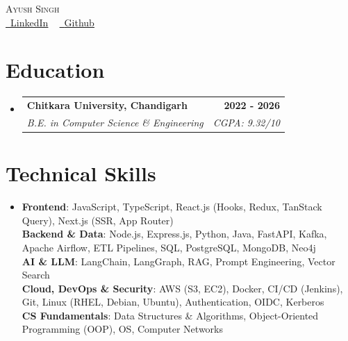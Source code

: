 \documentclass[letterpaper,11pt]{article}
\makeatletter
\newcommand{\resumeSubheading}[4]{
  \vspace{-2pt}\item
    \begin{tabular*}{1.0\textwidth}[t]{l@{\extracolsep{\fill}}r}
      \textbf{#1} & \textbf{\small #2} \\
      \textit{\small#3} & \textit{\small #4} \\
    \end{tabular*}\vspace{-7pt}
}
\newcommand{\resumeSubHeadingListStart}{\begin{itemize}[leftmargin=0.0in, label={}]}
\newcommand{\resumeSubHeadingListEnd}{\end{itemize}}
\makeatother
\begin{document}
\begin{center}
  {\Huge \scshape Ayush Singh} \\ \vspace{5pt}
  \href{https://www.linkedin.com/in/ayush-pratap-singh1}{\raisebox{-0.2\height}\faLinkedin\ \underline{LinkedIn}}  ~
  \href{https://github.com/tomar-ayush}{\raisebox{-0.2\height}\faGithub\ \underline{Github}}
  \vspace{-8pt}
\end{center}


\section{Education}
\resumeSubHeadingListStart
\resumeSubheading
  {Chitkara University, Chandigarh }{2022 - 2026}
  {B.E. in Computer Science \& Engineering}{CGPA: 9.32/10}
\resumeSubHeadingListEnd
\vspace{-14pt}

\section{Technical Skills}
\begin{itemize}[leftmargin=0.15in, label={}]
  \item{
    \textbf{Frontend}{: JavaScript, TypeScript, React.js (Hooks, Redux, TanStack Query), Next.js (SSR, App Router)} \\

    \textbf{Backend \& Data}{: Node.js, Express.js, Python, Java, FastAPI,  Kafka, Apache Airflow, ETL Pipelines, SQL, PostgreSQL, MongoDB, Neo4j} \\

    \textbf{AI \& LLM}{: LangChain, LangGraph, RAG, Prompt Engineering, Vector Search} \\

    \textbf{Cloud, DevOps \& Security}{: AWS (S3, EC2), Docker, CI/CD (Jenkins), Git, Linux (RHEL, Debian, Ubuntu), Authentication, OIDC, Kerberos} \\

    \textbf{CS Fundamentals}{: Data Structures \& Algorithms, Object-Oriented Programming (OOP), OS, Computer Networks}
  }
\end{itemize}
\vspace{-20pt}
\end{document}
